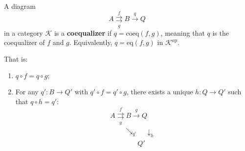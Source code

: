 A diagram
$$A \mathrel{\mathop{\rightrightarrows}\limits_{g}^{f}} B \xrightarrow{q} Q$$
in a category $\mathcal{K}$ is a \textbf{coequalizer} if $q = \text{coeq}(f, g)$, meaning that $q$ is the coequalizer of $f$ and $g$. Equivalently, $q = \text{eq}(f, g)$ in $\mathcal{K}^{\text{op}}$.

That is:
\begin{enumerate}
\item $q \circ f = q \circ g$;
\item For any $q': B \to Q'$ with $q' \circ f = q' \circ g$, there exists a unique $h: Q \to Q'$ such that $q \circ h = q'$:
\[
\begin{array}{c}
A \mathrel{\mathop{\rightrightarrows}\limits_{g}^{f}} B \xrightarrow{q} Q \\
\qquad \searrow_{q'} \quad \downarrow_{h} \\
\qquad\qquad Q'
\end{array}
\]
\end{enumerate}
